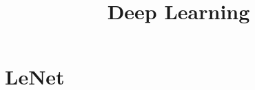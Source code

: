 





\newcommand{\titlefigure}{plots/architectures/lenet.png}
\newcommand{\learninggoals}{
  \item LeNet
  \item AlexNet
  \item VGG
  \item Network in Network
}

\title{Deep Learning}
\date{}






\section{LeNet}


